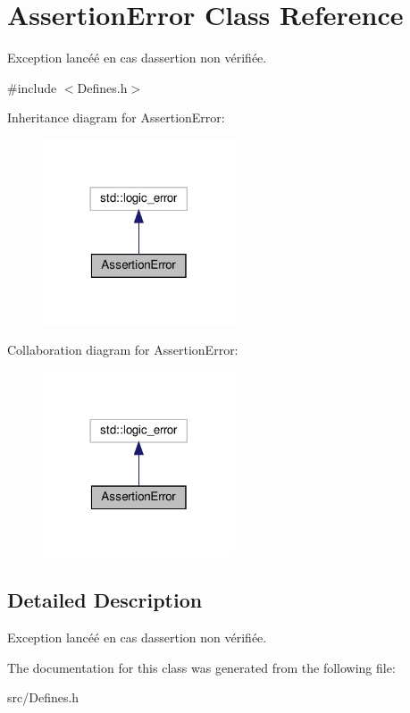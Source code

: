 \hypertarget{classAssertionError}{}\section{Assertion\+Error Class Reference}
\label{classAssertionError}


Exception lancéé en cas d\textquotesingle{}assertion non vérifiée.  




{\ttfamily \#include $<$Defines.\+h$>$}



Inheritance diagram for Assertion\+Error\+:\nopagebreak
\begin{figure}[H]
\begin{center}
\leavevmode
\includegraphics[width=161pt]{classAssertionError__inherit__graph}
\end{center}
\end{figure}


Collaboration diagram for Assertion\+Error\+:\nopagebreak
\begin{figure}[H]
\begin{center}
\leavevmode
\includegraphics[width=161pt]{classAssertionError__coll__graph}
\end{center}
\end{figure}


\subsection{Detailed Description}
Exception lancéé en cas d\textquotesingle{}assertion non vérifiée. 

The documentation for this class was generated from the following file\+:\begin{DoxyCompactItemize}
\item 
src/Defines.\+h\end{DoxyCompactItemize}
